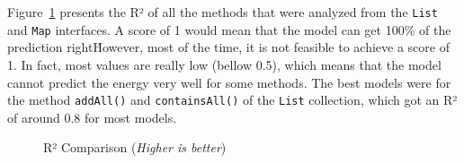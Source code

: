 
Figure~\ref{fig:r2_comparison} presents the R² of all the methods that were analyzed from the \texttt{List} and \texttt{Map} interfaces. A score of 1 would mean that the model can get 100\% of the prediction right\. However, most of the time, it is not feasible to achieve a score of 1. In fact, most values are really low (bellow 0.5), which means that the model cannot predict the energy very well for some methods. The best models were for the method \texttt{addAll()} and \texttt{containsAll()} of the \texttt{List} collection, which got an R² of around 0.8 for most models.

\begin{figure}[htbp]
  \centering
  \caption{R² Comparison (\textit{Higher is better})}
  \label{fig:r2_comparison}
\end{figure}

